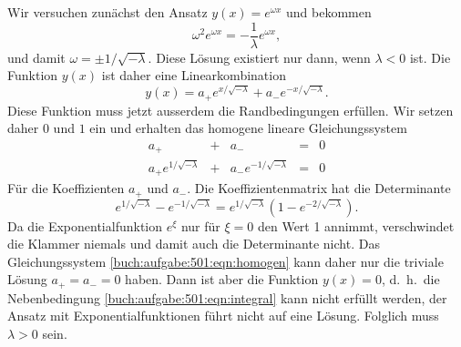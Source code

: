 \begin{loesung}
Wir versuchen zunächst den Ansatz $y(x)=e^{\omega x}$ und bekommen
\[
\omega^2e^{\omega x} = -\frac{1}{\lambda} e^{\omega x},
\]
und damit $\omega=\pm1/\!\sqrt{-\lambda}$.
Diese Lösung existiert nur dann, wenn $\lambda<0$ ist.
Die Funktion $y(x)$ ist daher eine Linearkombination 
\[
y(x) = a_+ e^{x/\!\sqrt{-\lambda}} + a_- e^{-x/\!\sqrt{-\lambda}}.
\]
Diese Funktion muss jetzt ausserdem die Randbedingungen erfüllen.
Wir setzen daher $0$ und $1$ ein und erhalten das homogene lineare
Gleichungssystem
\begin{equation}
\renewcommand{\arraycolsep}{3pt}
\begin{array}{lclcl}
a_+                        &+& a_-                         &=& 0 \\
a_+e^{1/\!\sqrt{-\lambda}} &+& a_-e^{-1/\!\sqrt{-\lambda}} &=& 0
\end{array}
\label{buch:aufgabe:501:eqn:homogen}
\end{equation}
Für die Koeffizienten $a_+$ und $a_-$.
Die Koeffizientenmatrix hat die Determinante
\[
e^{1/\!\sqrt{-\lambda}}-e^{-1/\!\sqrt{-\lambda}}
=
e^{1/\!\sqrt{-\lambda}}(1-e^{-2/\!\sqrt{-\lambda}}).
\]
Da die Exponentialfunktion $e^\xi$ nur für $\xi=0$ den Wert
1 annimmt, verschwindet die Klammer niemals und damit auch die
Determinante nicht.
Das Gleichungssystem \eqref{buch:aufgabe:501:eqn:homogen}
kann daher nur die triviale Lösung $a_+=a_-=0$ haben.
Dann ist aber die Funktion $y(x)=0$, d.~h.~die Nebenbedingung
\eqref{buch:aufgabe:501:eqn:integral} kann nicht erfüllt werden, 
der Ansatz mit Exponentialfunktionen führt nicht auf eine Lösung.
Folglich muss $\lambda>0$ sein.


\end{loesung}
